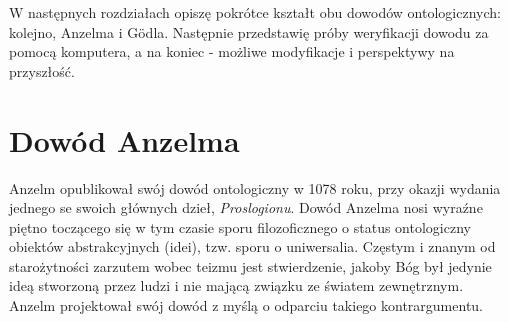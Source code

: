 \documentclass[runningheads]{llncs}
\begin{document}
W następnych rozdziałach opiszę pokrótce kształt obu dowodów ontologicznych: kolejno, Anzelma i G\"odla. Następnie przedstawię próby weryfikacji dowodu za pomocą komputera, a na koniec - możliwe modyfikacje i perspektywy na przyszłość. 

\section{Dowód Anzelma}
Anzelm opublikował swój dowód ontologiczny w 1078 roku, przy okazji wydania jednego se swoich głównych dzieł, \textit{Proslogionu}. Dowód Anzelma nosi wyraźne piętno toczącego się w tym czasie sporu filozoficznego o status ontologiczny obiektów abstrakcyjnych (idei), tzw. sporu o uniwersalia. Częstym i znanym od starożytności zarzutem wobec teizmu jest stwierdzenie, jakoby Bóg był jedynie ideą stworzoną przez ludzi i nie mającą związku ze światem zewnętrznym. Anzelm projektował swój dowód z myślą o odparciu takiego kontrargumentu. 
\end{document}
